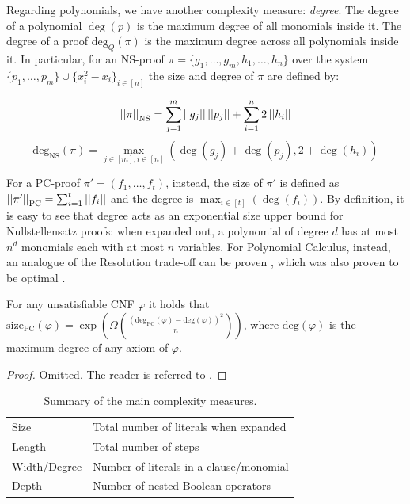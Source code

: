 Regarding polynomials, we have another complexity measure: \textit{degree}. The degree of a polynomial $\deg(p)$ is the maximum degree of all monomials inside it. The degree of a proof $\mathrm{deg}_Q(\pi)$ is the maximum degree across all polynomials inside it. In particular, for an NS-proof $\pi = \{g_1, \ldots, g_m, h_1, \ldots, h_n\}$ over the system $\{p_1, \ldots, p_m\} \cup \{x_i^2 - x_i\}_{i \in [n]}$ the size and degree of $\pi$ are defined by:

\begin{equation}
    \left|\left|\pi\right|\right|_{\mathrm{NS}} = \sum_{j = 1}^m \left|\left|g_j\right|\right| \left|\left|p_j\right|\right| + \sum_{i = 1}^n 2\left|\left|h_i\right|\right|
\end{equation}
\begin{equation}
    \mathrm{deg}_\mathrm{NS}(\pi) = \max_{j \in [m], i \in [n]} (\deg(g_j) + \deg(p_j), 2 + \deg(h_i))
\end{equation}

For a PC-proof $\pi' = (f_1, \ldots, f_t)$, instead, the size of $\pi'$ is defined as $\left|\left|\pi'\right|\right|_{\mathrm{PC}} = \sum_{i = 1}^t \left|\left|f_i\right|\right|$ and the degree is $\max_{i \in [t]} (\deg(f_i))$. By definition, it is easy to see that degree acts as an exponential size upper bound for Nullstellensatz proofs: when expanded out, a polynomial of degree $d$ has at most $n^{d}$ monomials each with at most $n$ variables. For Polynomial Calculus, instead, an analogue of the Resolution trade-off can be proven \cite{pc_tradeoff}, which was also proven to be optimal \cite{lauria_optim}.

\begin{theorem}
    For any unsatisfiable CNF $\varphi$ it holds that $\mathrm{size}_{\mathrm{PC}}(\varphi) = \exp \left (\Omega \left (\frac{(\mathrm{deg}_{\mathrm{PC}}(\varphi) - \mathrm{deg}(\varphi))^2}{n}\right ) \right )$, where $\mathrm{deg}(\varphi)$ is the maximum degree of any axiom of $\varphi$.
\end{theorem}

\begin{proof}
    Omitted. The reader is referred to \cite{pc_tradeoff}.
\end{proof}

\begin{table}[t]
  \centering
  \begin{tabular}{l|l}
    \toprule
    Size & Total number of literals when expanded\\
    Length & Total number of steps\\
    Width/Degree & Number of literals in a clause/monomial\\
    Depth & Number of nested Boolean operators \\
    \bottomrule
  \end{tabular}

  \qquad
  
  \caption{Summary of the main complexity measures.}
  \label{tab:measures}
\end{table}

